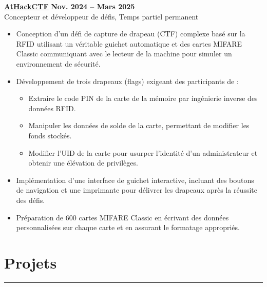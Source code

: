 \documentclass[10pt]{article}
\begin{document}
{\href{https://www.athackctf.com}{\textbf{AtHackCTF}}} \hfill \textbf{Nov. 2024 -- Mars 2025} \\
{Concepteur et développeur de défis, Temps partiel permanent}
\vspace{-3mm}
\begin{itemize}[left=0.15in, itemsep=0pt]
    \item Conception d'un défi de capture de drapeau (CTF) complexe basé sur la RFID utilisant un véritable guichet automatique et des cartes MIFARE Classic communiquant avec le lecteur de la machine pour simuler un environnement de sécurité.
    \item Développement de trois drapeaux (flags) exigeant des participants de :
    
        \begin{itemize}[left=0.15in, itemsep=0pt]
            \vspace{-2mm}
            \item Extraire le code PIN de la carte de la mémoire par ingénierie inverse des données RFID.
            \item Manipuler les données de solde de la carte, permettant de modifier les fonds stockés.
            \item Modifier l'UID de la carte pour usurper l'identité d'un administrateur et obtenir une élévation de privilèges.
        \end{itemize}
        \vspace{-2mm}
    
    \item Implémentation d'une interface de guichet interactive, incluant des boutons de navigation et une imprimante pour délivrer les drapeaux après la réussite des défis.
    \item Préparation de 600 cartes MIFARE Classic en écrivant des données personnalisées sur chaque carte et en assurant le formatage appropriés.
\end{itemize}

\vspace{-6mm} %
\section*{Projets}
\vspace{-2mm}
\hrule
\vspace{0mm}
\end{document}
